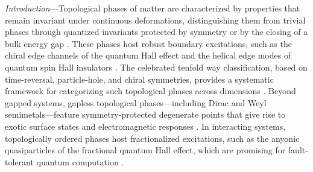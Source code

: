 \documentclass[twocolumn,english,prl,epsfig,rotate,showpacs,aps, superscriptaddress]{revtex4-2}
\begin{document}
\textit{Introduction}---Topological phases of matter are characterized by properties that remain invariant under continuous deformations, distinguishing them from trivial phases through quantized invariants protected by symmetry or by the closing of a bulk energy gap \cite{hasan2010colloquium,qi2011topological}. These phases host robust boundary excitations, such as the chiral edge channels of the quantum Hall effect \cite{von202040} and the helical edge modes of quantum spin Hall insulators \cite{bernevig2006quantum,maciejko2011quantum}. The celebrated tenfold way classification, based on time-reversal, particle-hole, and chiral symmetries, provides a systematic framework for categorizing such topological phases across dimensions \cite{kitaev2009periodic,ryu2010topological,chiu2016classification}. Beyond gapped systems, gapless topological phases---including Dirac and Weyl semimetals---feature symmetry-protected degenerate points that give rise to exotic surface states and electromagnetic responses \cite{hosur2013recent,yan2017topological,armitage2018weyl}. In interacting systems, topologically ordered phases host fractionalized excitations, such as the anyonic quasiparticles of the fractional quantum Hall effect, which are promising for fault-tolerant quantum computation \cite{stormer1999nobel,moore1991nonabelions}.
\end{document}

